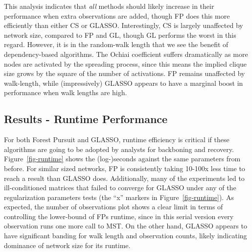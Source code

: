 \documentclass[%
	12pt,
		oneside,
		letterpaper
]{book}
\begin{document}
This analysis indicates that \emph{all} methods should likely increase in their performance when extra observations are added, though FP does this more efficiently than either CS or GLASSO.
Interestingly, CS is largely unaffected by network size, compared to FP and GL, though GL performs the worst in this regard.
However, it is in the random-walk length that we see the benefit of dependency-based algorithms.
The Ochiai coefficient suffers dramatically as more nodes are activated by the spreading process, since this means the implied clique size grows by the square of the number of activations.
FP remains unaffected by walk-length, while (impressively) GLASSO appears to have a marginal boost in performance when walk lengths are high.

\subsection{Results - Runtime Performance}\label{results---runtime-performance}

For both Forest Pursuit and GLASSO, runtime efficiency is critical if these algorithms are going to be adopted by analysts for backboning and recovery.
Figure~\ref{fig-runtime} shows the (log-)seconds against the same parameters from before.
For similar sized networks, FP is consistently taking 10-100x less time to reach a result than GLASSO does.
Additionally, many of the experiments led to ill-conditioned matrices that failed to converge for GLASSO under any of the regularization parameters tests (the ``x'' markers in Figure~\ref{fig-runtime}).
As expected, the number of observations plot shows a clear limit in terms of controlling the lower-bound of FPs runtime, since in this serial version every observation runs one more call to MST.
On the other hand, GLASSO appears to have significant banding for walk length and observation counts, likely indicating dominance of network size for its runtime.
\end{document}
